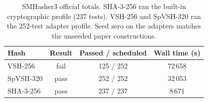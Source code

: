 \begin{table}[ht]
\caption{SMHasher3 official totals. SHA-3-256 ran the built-in cryptographic profile (237 tests). VSH-256 and SpVSH-320 ran the 252-test adapter profile. Seed zero on the adapters matches the unseeded paper constructions.}
\label{tab:smhasher3}
\centering
\begin{tabular}{@{}lccc@{}}
\toprule
Hash & Result & Passed / scheduled & Wall time (s) \\
\midrule
VSH-256 & fail & 125 / 252 & 72\,658 \\
SpVSH-320 & pass & 252 / 252 & 32\,053 \\
SHA-3-256 & pass & 237 / 237 & 8\,671 \\
\bottomrule
\end{tabular}
\end{table}
